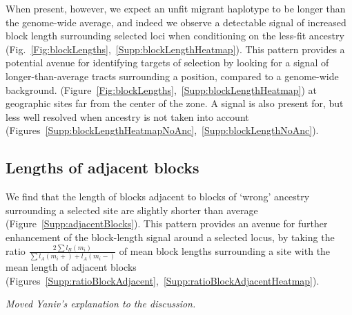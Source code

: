 \documentclass[12pt]{article}
\newcommand{\alisa}[1]{{\em \color{red} #1}}
\begin{document}
When present, however, we expect an unfit migrant haplotype to be longer than the genome-wide average, and indeed we observe a detectable signal of increased block length surrounding selected loci when conditioning on the less-fit ancestry (Fig.~\ref{Fig:blockLengths},~\ref{Supp:blockLengthHeatmap}). This pattern provides a potential avenue for identifying targets of selection by looking for a signal of longer-than-average tracts surrounding a position, compared to a genome-wide background. (Figure~\ref{Fig:blockLengths},~\ref{Supp:blockLengthHeatmap}) at geographic sites far from the center of the zone. A signal is also present for, but less well resolved when ancestry is not taken into account (Figures~\ref{Supp:blockLengthHeatmapNoAnc},~\ref{Supp:blockLengthNoAnc}).

\subsection*{Lengths of adjacent blocks}
We find that the length of blocks adjacent to blocks of `wrong' ancestry surrounding a selected site are slightly shorter than average (Figure~\ref{Supp:adjacentBlocks}). This pattern provides an avenue for further enhancement of the block-length signal around a selected locus, by taking the ratio $\frac{2\sum{l_B(m_i)}}{\sum{l_A(m_i+)+l_A(m_i-)}}$ of mean block lengths surrounding a site with the mean length of adjacent blocks (Figures~\ref{Supp:ratioBlockAdjacent},~\ref{Supp:ratioBlockAdjacentHeatmap}).

\alisa{Moved Yaniv's explanation to the discussion.}



\end{document}
